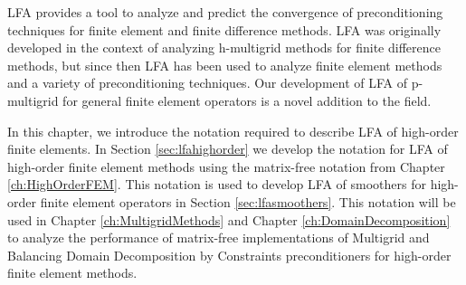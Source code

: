 LFA provides a tool to analyze and predict the convergence of preconditioning techniques for finite element and finite difference methods.
LFA \cite{brandt1977multi} was originally developed in the context of analyzing h-multigrid methods for finite difference methods, but since then LFA has been used to analyze finite element methods and a variety of preconditioning techniques.
Our development of LFA of p-multigrid for general finite element operators is a novel addition to the field.

In this chapter, we introduce the notation required to describe LFA of high-order finite elements.
In Section \ref{sec:lfahighorder} we develop the notation for LFA of high-order finite element methods using the matrix-free notation from Chapter \ref{ch:HighOrderFEM}.
This notation is used to develop LFA of smoothers for high-order finite element operators in Section \ref{sec:lfasmoothers}.
This notation will be used in Chapter \ref{ch:MultigridMethods} and Chapter \ref{ch:DomainDecomposition} to analyze the performance of matrix-free implementations of Multigrid and Balancing Domain Decomposition by Constraints preconditioners for high-order finite element methods.
